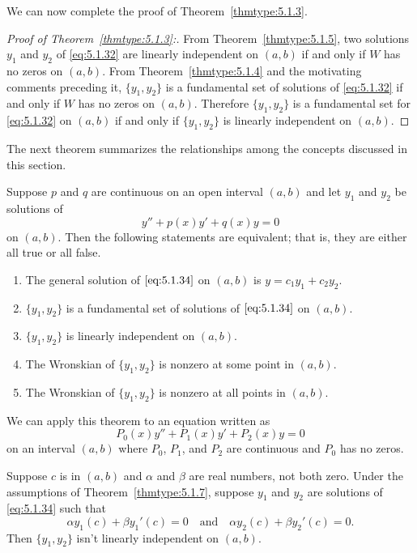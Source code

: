 \documentclass{ximera}
\begin{document}
We can now complete the proof of Theorem~\ref{thmtype:5.1.3}.
\begin{proof}[Proof of Theorem~\ref{thmtype:5.1.3}:]
From Theorem~\ref{thmtype:5.1.5}, two solutions $y_1$ and $y_2$ of
\eqref{eq:5.1.32} are linearly
independent on  $(a,b)$ if and only if $W$ has no zeros on  $(a,b)$.
From Theorem~\ref{thmtype:5.1.4} and the motivating comments preceding
it,  $\{y_1,y_2\}$ is  a fundamental set of solutions of
\eqref{eq:5.1.32}  if and only if $W$ has no zeros on  $(a,b)$.
Therefore  $\{y_1,y_2\}$ is   a fundamental set
for \eqref{eq:5.1.32} on  $(a,b)$ if and only if  $\{y_1,y_2\}$
is linearly independent on $(a,b)$.  
\end{proof}
The next theorem summarizes the relationships among the
concepts discussed in this section.

\begin{theorem}\label{thmtype:5.1.6}
 Suppose  $p$ and $q$ are continuous on an open interval $(a,b)$
and  let $y_1$ and $y_2$ be solutions of
\begin{equation}\label{eq:5.1.34}
y''+p(x)y'+q(x)y=0
\end{equation}
on  $(a,b).$  Then the following statements are equivalent; that
is, they are either all true or all false.
\begin{enumerate}
\item %
The general solution of $\eqref{eq:5.1.34}$ on  $(a,b)$ is
$y=c_1y_1+c_2y_2$.
\item %
 $\{y_1,y_2\}$ is a fundamental set of solutions of $\eqref{eq:5.1.34}$
on  $(a,b).$
\item %
 $\{y_1,y_2\}$ is linearly independent on  $(a,b)$.
\item %
The Wronskian of   $\{y_1,y_2\}$ is nonzero at some point in  $(a,b)$.
\item %
The Wronskian of   $\{y_1,y_2\}$ is nonzero at all points in  $(a,b)$.
\end{enumerate}
\end{theorem}

We can apply this theorem to an equation written as
$$
P_0(x)y''+P_1(x)y'+P_2(x)y=0
$$
on an interval $(a,b)$ where $P_0$, $P_1$, and $P_2$
are continuous and $P_0$ has no zeros.


\begin{theorem}\label{thmtype:5.1.7}
Suppose  $c$ is in $(a,b)$ and $\alpha$ and $\beta$  are real numbers,
not both zero.
Under the assumptions of Theorem~\ref{thmtype:5.1.7}, suppose
$y_{1}$ and $y_{2}$ are  solutions  of \eqref{eq:5.1.34}   such that
\begin{equation} \label{eq:5.1.35}
\alpha y_{1}(c)+\beta y_{1}'(c)=0\quad\text{and}\quad
\alpha y_{2}(c)+\beta y_{2}'(c)=0.
\end{equation}
Then $\{y_{1},y_{2}\}$ isn't  linearly independent on $(a,b)$.
\end{theorem}
\end{document}
